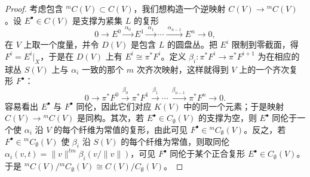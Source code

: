 \begin{proof}
考虑包含 ${}^{m}C(V)\subset C(V)$，我们想构造一个逆映射 $C(V)\to{}^{m}C(V)$。设 $E^\bullet\in C(V)$ 是支撑为紧集 $L$ 的复形
\[
0\longrightarrow E^0\xrightarrow{\ \alpha_0\ }E^1\xrightarrow{\ \alpha_1\ }\cdots\xrightarrow{\ \alpha_{n-1}\ }E^n\longrightarrow 0,
\]
在 $V$ 上取一个度量，并令 $D(V)$ 是包含 $L$ 的圆盘丛。把 $E^i$ 限制到零截面，得 $F^i=E^i|_X$，于是在 $D(V)$ 上有 $E^i\cong\pi^*F^i$。定义 $\beta_i:\pi^*F^i\to\pi^*F^{i+1}$ 为在相应的球丛 $S(V)$ 上与 $\alpha_i$ 一致的那个 $m$ 次齐次映射，这样就得到 $V$ 上的一个齐次复形 $F^\bullet$：
\[
0\longrightarrow\pi^*F^0\xrightarrow{\ \beta_0\ }\pi^*F^1\xrightarrow{\ \beta_1\ }\cdots\xrightarrow{\ \beta_{n-1}\ }\pi^*F^n\longrightarrow 0.
\]
容易看出 $E^\bullet$ 与 $F^\bullet$ 同伦，因此它们对应 $K(V)$ 中的同一个元素；于是映射 $C(V)\to{}^{m}C(V)$ 是同构。其次，若 $E^\bullet\in C_\emptyset(V)$ 的支撑为空，则 $E^\bullet$ 同伦于一个使 $\alpha_i$ 沿 $V$ 的每个纤维为常值的复形，由此可见 $F^\bullet\in{}^{m}C_\emptyset(V)$。反之，若 $F^\bullet\in{}^{m}C_\emptyset(V)$ 使 $\beta_i$ 沿 $S(V)$ 的每个纤维为常值，则取同伦 $\alpha_i(v,t)=\|v\|^{tm}\beta_i(v/\|v\|)$，可见 $F^\bullet$ 同伦于某个正合复形 $E^\bullet\in C_\emptyset(V)$。于是 ${}^{m}C(V)/{}^{m}C_\emptyset(V)\cong C(V)/C_\emptyset(V)$。
\end{proof}
